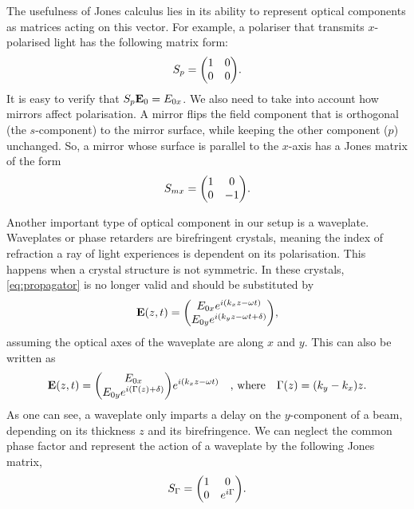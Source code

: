 The usefulness of Jones calculus lies in its ability to represent optical components as matrices acting on this vector. For example, a polariser that transmits $ x $-polarised light has the following matrix form:
\begin{equation}
	S_p = \mqty(1 & 0 \\ 0 & 0).
\end{equation}
It is easy to verify that $ S_p \vb{E}_0 = E_{0x} $.  We also need to take into account how mirrors affect polarisation. A mirror flips the field component that is orthogonal (the $ s $-component) to the mirror surface, while keeping the other component ($ p $) unchanged. So, a mirror whose surface is parallel to the $ x $-axis has a Jones matrix of the form
\begin{equation}
	S_{mx} = \mqty(1 & 0 \\ 0 & -1).
\end{equation}

Another important type of optical component in our setup is a waveplate. Waveplates or phase retarders are birefringent crystals, meaning the index of refraction a ray of light experiences is dependent on its polarisation. This happens when a crystal structure is not symmetric.  In these crystals, \autoref{eq:propagator} is no longer valid and should be substituted by
\begin{equation}
	\vb{E}(z, t) = \mqty(\Eox e^{i(k_x z-\omega t)} \\ \Eoy e^{i(k_y z-\omega t + \delta)} ),
\end{equation}
assuming the optical axes of the waveplate are along $ x $ and $ y $. This can also be written as
\begin{equation}
	\vb{E}(z, t) = \mqty(\Eox  \\ \Eoy e^{i(\Gamma(z) + \delta)} ) e^{i(k_x z-\omega t)}
	\qq{, where}
	\Gamma(z) = (k_y-k_x) z.
\end{equation}
As one can see, a waveplate only imparts a delay on the $ y $-component of a beam, depending on its thickness $ z $ and its birefringence. We can neglect the common phase factor and represent the action of a waveplate by the following Jones matrix, 
\begin{equation}
	S_\Gamma = \mqty(1 & 0 \\ 0 & e^{i\Gamma}).
\end{equation}


